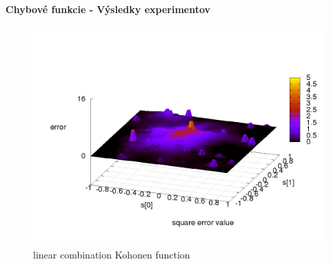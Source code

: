 \documentclass[xcolor=dvipsnames]{beamer}
\begin{document}
\begin{frame}{\bf Chybové funkcie - Výsledky experimentov}
\begin{minipage}{.5\textwidth}
\begin{figure}[!htb]
\centering
\includegraphics[scale=.2]{../../results_q_learning/map_1/function_type_4/q_learning_error.png}
\caption{linear combination Kohonen function}
\end{figure}


\end{minipage}
\end{frame}
\end{document}
